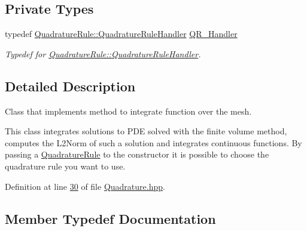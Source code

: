 \subsection*{Private Types}
\begin{DoxyCompactItemize}
\item 
typedef \hyperlink{classFVCode3D_1_1QuadratureRule_aa112834316b236e0a9072b09fd94d9cc}{Quadrature\+Rule\+::\+Quadrature\+Rule\+Handler} \hyperlink{classFVCode3D_1_1Quadrature_ac1cc519f7f97b5dbb920ffffb24a2130}{Q\+R\+\_\+\+Handler}
\begin{DoxyCompactList}\small\item\em Typedef for \hyperlink{classFVCode3D_1_1QuadratureRule_aa112834316b236e0a9072b09fd94d9cc}{Quadrature\+Rule\+::\+Quadrature\+Rule\+Handler}. \end{DoxyCompactList}\end{DoxyCompactItemize}


\subsection{Detailed Description}
Class that implements method to integrate function over the mesh. 

This class integrates solutions to P\+DE solved with the finite volume method, computes the L2\+Norm of such a solution and integrates continuous functions. By passing a \hyperlink{classFVCode3D_1_1QuadratureRule}{Quadrature\+Rule} to the constructor it is possible to choose the quadrature rule you want to use. 

Definition at line \hyperlink{Quadrature_8hpp_source_l00030}{30} of file \hyperlink{Quadrature_8hpp_source}{Quadrature.\+hpp}.



\subsection{Member Typedef Documentation}
\subsubsection[{\texorpdfstring{Q\+R\+\_\+\+Handler}{QR_Handler}}]{\hspace{0.3cm}{\ttfamily [private]}}\hypertarget{classFVCode3D_1_1Quadrature_ac1cc519f7f97b5dbb920ffffb24a2130}{}\label{classFVCode3D_1_1Quadrature_ac1cc519f7f97b5dbb920ffffb24a2130}


